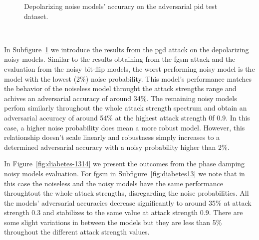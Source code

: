 \begin{figure}[!h]
\begin{subfigure}{0.45\textwidth}
      \label{fig:diabetes12}
  \end{subfigure}
  \caption{Depolarizing noise models' accuracy on the adversarial \ac{pid} test dataset.}
  \label{fig:diabetes-1112}
\end{figure} \

In Subfigure~\ref{fig:diabetes12} we introduce the results from the \ac{pgd}
attack on the depolarizing noisy models. Similar to the results obtaining
from the \ac{fgsm} attack and the evaluation from the noisy bit-flip models,
the worst performing noisy model is the model with the lowest (2\%)
noise probability. This model's performance matches the behavior of the
noiseless model throught the attack strengths range and achives an
adversarial accuracy of around 34\%. The remaining noisy models perfom
similarly throughout the whole attack strength spectrum and obtain
an adversarial accuracy of around 54\% at the highest attack strength
0f 0.9. In this case, a higher noise probability does mean a more robust
model. However, this relationship doesn't scale linearly and robustness
simply increases to a determined adversarial accuracy with a noisy
probability higher than 2\%. \

In Figure~\ref{fig:diabetes-1314} we present the outcomes from the phase damping
noisy models evaluation. For \ac{fgsm} in Subfigure~\ref{fig:diabetes13}
we note that in this case the noiseless and the noisy models have the
same performance throughtout the whole attack strengths, disregarding
the noise probabilities. All the models' adversarial accuracies decrease
significantly to around 35\% at attack strength 0.3 and stabilizes to the
same value at attack strength 0.9. There are some slight variations in
between the models but they are less than 5\% throughout the different
attack strength values. \

